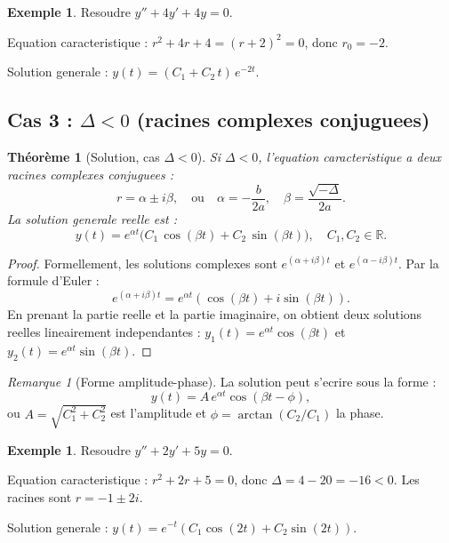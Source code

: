 \documentclass[12pt,a4paper,openany]{book}
\theoremstyle{definition}
\newtheorem{exemple}[definition]{Exemple}
\theoremstyle{plain}
\newtheorem{theoreme}[definition]{Théorème}
\theoremstyle{remark}
\newtheorem{remarque}[definition]{Remarque}
\newcommand{\R}{\mathbb{R}}
\begin{document}
\begin{exemple}\label{ex:delta-zero}
Resoudre $y'' + 4y' + 4y = 0$.

Equation caracteristique : $r^2 + 4r + 4 = (r+2)^2 = 0$, donc $r_0 = -2$.

Solution generale : $y(t) = (C_1 + C_2\, t)\, e^{-2t}$.
\end{exemple}

\subsection{Cas 3 : $\Delta < 0$ (racines complexes conjuguees)}\label{subsec:delta-negatif}

\begin{theoreme}[Solution, cas $\Delta < 0$]\label{thm:delta-neg}
Si $\Delta < 0$, l'equation caracteristique a deux racines complexes conjuguees :
\[
  r = \alpha \pm i\beta, \quad \text{ou} \quad \alpha = -\frac{b}{2a}, \quad \beta = \frac{\sqrt{-\Delta}}{2a}.
\]
La solution generale \emph{reelle} est :
\begin{equation}\label{eq:sol-delta-neg}
  y(t) = e^{\alpha t}\bigl(C_1\, \cos(\beta t) + C_2\, \sin(\beta t)\bigr), \quad C_1, C_2 \in \R.
\end{equation}
\end{theoreme}

\begin{proof}
Formellement, les solutions complexes sont $e^{(\alpha + i\beta)t}$ et $e^{(\alpha - i\beta)t}$. Par la formule d'Euler :
\[
  e^{(\alpha + i\beta)t} = e^{\alpha t}(\cos(\beta t) + i\sin(\beta t)).
\]
En prenant la partie reelle et la partie imaginaire, on obtient deux solutions reelles lineairement independantes : $y_1(t) = e^{\alpha t}\cos(\beta t)$ et $y_2(t) = e^{\alpha t}\sin(\beta t)$.
\end{proof}

\begin{remarque}[Forme amplitude-phase]\label{rem:amplitude-phase}
La solution peut s'ecrire sous la forme :
\[
  y(t) = A\, e^{\alpha t} \cos(\beta t - \phi),
\]
ou $A = \sqrt{C_1^2 + C_2^2}$ est l'amplitude et $\phi = \arctan(C_2/C_1)$ la phase.
\end{remarque}

\begin{exemple}\label{ex:delta-neg}
Resoudre $y'' + 2y' + 5y = 0$.

Equation caracteristique : $r^2 + 2r + 5 = 0$, donc $\Delta = 4 - 20 = -16 < 0$. Les racines sont $r = -1 \pm 2i$.

Solution generale : $y(t) = e^{-t}(C_1 \cos(2t) + C_2 \sin(2t))$.
\end{exemple}
\end{document}
